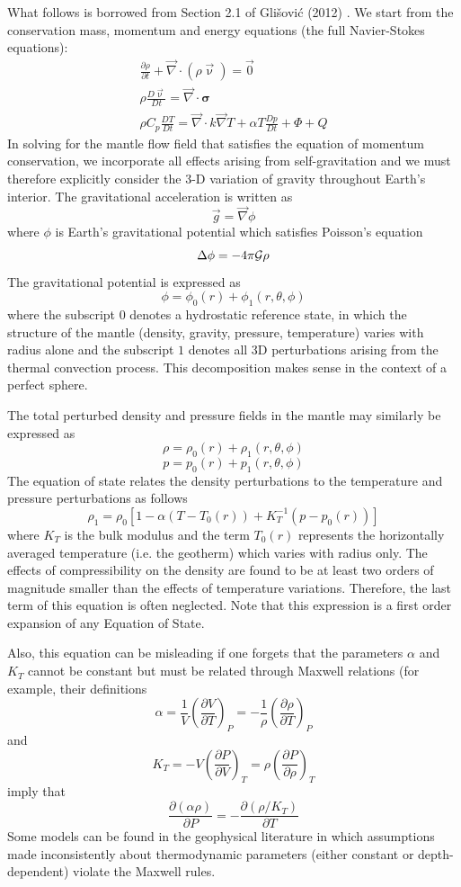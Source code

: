 What follows is borrowed from Section 2.1 of Gli{\v{s}}ovi{\'c} \etal (2012) \cite{glfm12}.
We start from the conservation mass, momentum and energy equations (the full Navier-Stokes equations):
\begin{eqnarray}
\frac{\partial \rho}{\partial t} + \vec\nabla \cdot (\rho \vec\upnu) = \vec{0} \\
\rho \frac{D\vec\upnu}{Dt} = \vec\nabla\cdot {\bm \sigma} \\
\rho C_p \frac{D T}{Dt} = \vec\nabla \cdot k \vec\nabla T + \alpha T \frac{Dp}{Dt} + \Phi + Q
\end{eqnarray}
In solving for the mantle flow field that satisfies the equation of momentum conservation, 
we incorporate all effects arising from
self-gravitation and we must therefore explicitly consider the 3-D variation of 
gravity throughout Earth's interior. The
gravitational acceleration is written as
\[
\vec{g} = \vec\nabla \phi
\]
where $\phi$ is Earth's gravitational potential which satisfies Poisson's equation
\[
\Delta \phi = - 4 \pi {\cal G} \rho
\]
The gravitational potential is expressed as
\[
\phi = \phi_0(r) + \phi_1(r,\theta,\phi)
\]
where the subscript $0$ denotes a hydrostatic reference state, 
in which the structure of the mantle (density, gravity, pressure, temperature) varies
with radius alone and the subscript $1$ denotes all 3D perturbations arising from the 
thermal convection process. This decomposition makes sense in the context of a perfect sphere.

The total perturbed density and pressure fields in the mantle may similarly be expressed as
\[
\rho = \rho_0(r) + \rho_1(r,\theta,\phi)
\]
\[
p = p_0(r) + p_1(r,\theta,\phi)
\]
The equation of state relates the density perturbations to the temperature and pressure perturbations 
as follows
\[
\rho_1 = \rho_0[1-\alpha(T-T_0(r))+K_T^{-1} (p-p_0(r))] 
\]
where $K_T$ is the bulk modulus and the term $T_0(r)$ represents the horizontally averaged temperature (i.e.
the geotherm) which varies with radius only. 
The effects of compressibility on the density are found to be at least two orders of magnitude
smaller than the effects of temperature variations. Therefore, the last term 
of this equation is often neglected.
Note that this expression is a first order expansion of any Equation of State. 

Also, this equation can be misleading if one forgets that the parameters $\alpha$ and $K_T$
cannot be constant but must be related through Maxwell relations (for example,
their definitions 
\[
\alpha = \frac{1}{V} \left( \frac{\partial V}{\partial T} \right)_P 
= -\frac{1}{\rho} \left( \frac{\partial \rho}{\partial T} \right)_P
\]
and 
\[
K_T 
= - V \left( \frac{\partial P}{\partial V} \right)_T
= \rho \left( \frac{\partial P}{\partial \rho} \right)_T
\]
imply that 
\[
\frac{\partial (\alpha\rho)}{\partial P}
= 
-\frac{\partial (\rho/K_T)}{\partial T}
\]
Some models can be found in the geophysical literature in which assumptions made inconsistently
about thermodynamic parameters (either constant or depth-dependent) violate the Maxwell rules.

